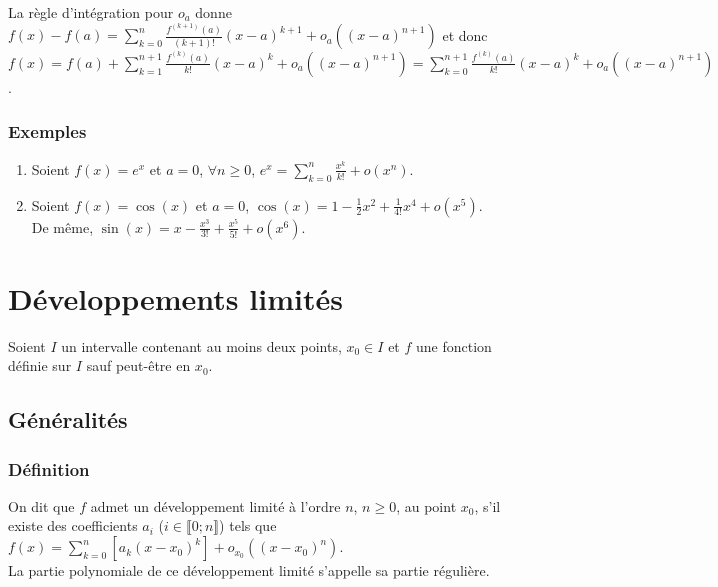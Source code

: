 \documentclass[a4paper,10pt]{book} %
\newcommand{\dl}{développement limité }
\newcommand{\displayAmath}{\displaystyle}
\begin{document}
La règle d'intégration pour $o_a$ donne $\displaystyle f(x)-f(a)=\sum\limits_{k=0}^n\frac{f^{(k+1)}(a)}{(k+1)!}(x-a)^{k+1} +o_a((x-a)^{n+1})$ et donc  $\displayAmath f(x)=f(a)+\sum_{k=1}^{n+1}\frac{f^{(k)}(a)}{k!}(x-a)^{k}+o_a((x-a)^{n+1})=\sum_{k=0}^{n+1}\frac{f^{(k)}(a)}{k!}(x-a)^{k}+o_a((x-a)^{n+1})$.

\subsection{Exemples}
\begin{enumerate}
\item Soient $f(x)=e^x$ et $a=0$, $\forall n\geq 0$, $\displaystyle e^x=\sum_{k=0}^{n}\frac{x^k}{k!}+o(x^n)$.\\

\item Soient $f(x)=\cos(x)$ et $a=0$, $\cos(x)=1-\frac{1}{2}x^2+\frac{1}{4!}x^4+o(x^5)$.\\
De même, $\sin(x)=x-\frac{x^3}{3!}+\frac{x^5}{5!}+o(x^6)$.
\end{enumerate}






\chapter{Développements limités}
Soient $I$ un intervalle contenant au moins deux points, $x_0\in I$ et $f$ une fonction définie sur $I$ sauf peut-être en $x_0$.

\section{Généralités}
\subsection{Définition}
On dit que $f$ admet un \dl à l'ordre $n$, $n\geq 0$, au point $x_0$, s'il existe des coefficients $a_i$ ($i\in \llbracket 0;n\rrbracket$) tels que $\displaystyle f(x)=\sum\limits_{k=0}^{n}\left[a_k(x-x_0)^k\right]+o_{x_0}((x-x_0)^n)$.\\

La partie polynomiale de ce \dl s'appelle sa partie régulière.
\end{document}
